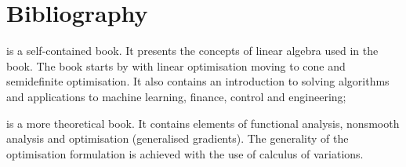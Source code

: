 \chapter{Bibliography}
\minitoc

\begin{description}
	\item \citep{CalafioreGhaoui2014} is a self-contained book. It presents the concepts of linear algebra used in the book. The book starts by with linear optimisation moving to cone and semidefinite optimisation. It also contains an introduction to solving algorithms and applications to machine learning, finance, control and engineering;
	
	\item \citep{Clarke:2013} is a more theoretical book. It contains elements of functional analysis, nonsmooth analysis and optimisation (generalised gradients). The generality of the optimisation formulation is achieved with the use of calculus of variations.
\end{description}


\clearpage
\printbibliography[segment=\therefsegment,heading=subbibintoc]